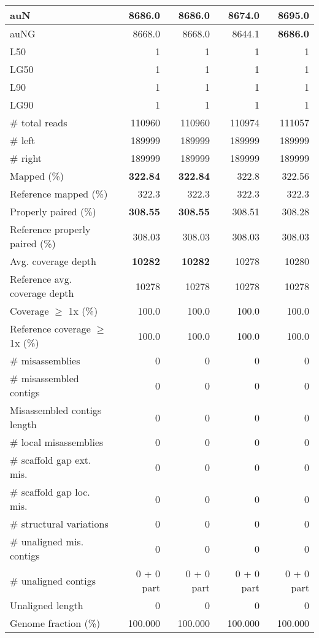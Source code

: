 \documentclass[12pt,a4paper]{article}
\begin{document}
\begin{table}[ht]
\begin{center}
\begin{tabular}{|l*{4}{|r}|}
auN & 8686.0 & 8686.0 & 8674.0 & {\bf 8695.0} \\ \hline
auNG & 8668.0 & 8668.0 & 8644.1 & {\bf 8686.0} \\ \hline
L50 & 1 & 1 & 1 & 1 \\ \hline
LG50 & 1 & 1 & 1 & 1 \\ \hline
L90 & 1 & 1 & 1 & 1 \\ \hline
LG90 & 1 & 1 & 1 & 1 \\ \hline
\# total reads & 110960 & 110960 & 110974 & 111057 \\ \hline
\# left & 189999 & 189999 & 189999 & 189999 \\ \hline
\# right & 189999 & 189999 & 189999 & 189999 \\ \hline
Mapped (\%) & {\bf 322.84} & {\bf 322.84} & 322.8 & 322.56 \\ \hline
Reference mapped (\%) & 322.3 & 322.3 & 322.3 & 322.3 \\ \hline
Properly paired (\%) & {\bf 308.55} & {\bf 308.55} & 308.51 & 308.28 \\ \hline
Reference properly paired (\%) & 308.03 & 308.03 & 308.03 & 308.03 \\ \hline
Avg. coverage depth & {\bf 10282} & {\bf 10282} & 10278 & 10280 \\ \hline
Reference avg. coverage depth & 10278 & 10278 & 10278 & 10278 \\ \hline
Coverage $\geq$ 1x (\%) & 100.0 & 100.0 & 100.0 & 100.0 \\ \hline
Reference coverage $\geq$ 1x (\%) & 100.0 & 100.0 & 100.0 & 100.0 \\ \hline
\# misassemblies & 0 & 0 & 0 & 0 \\ \hline
\# misassembled contigs & 0 & 0 & 0 & 0 \\ \hline
Misassembled contigs length & 0 & 0 & 0 & 0 \\ \hline
\# local misassemblies & 0 & 0 & 0 & 0 \\ \hline
\# scaffold gap ext. mis. & 0 & 0 & 0 & 0 \\ \hline
\# scaffold gap loc. mis. & 0 & 0 & 0 & 0 \\ \hline
\# structural variations & 0 & 0 & 0 & 0 \\ \hline
\# unaligned mis. contigs & 0 & 0 & 0 & 0 \\ \hline
\# unaligned contigs & 0 + 0 part & 0 + 0 part & 0 + 0 part & 0 + 0 part \\ \hline
Unaligned length & 0 & 0 & 0 & 0 \\ \hline
Genome fraction (\%) & 100.000 & 100.000 & 100.000 & 100.000 \\ \hline

\end{tabular}
\end{center}
\end{table}
\end{document}

